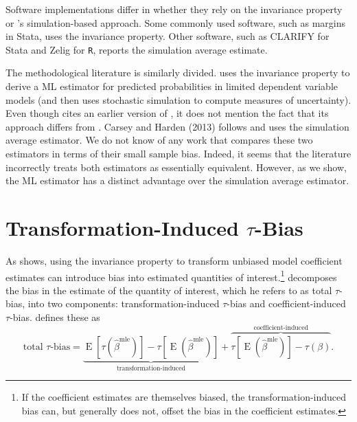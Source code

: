 \documentclass[11pt]{article}
\DeclareMathOperator*{\E}{\text{E}}
\begin{document}
Software implementations differ in whether they rely on the invariance property or \cite{KingTomzWittenberg2000}'s simulation-based approach. Some commonly used software, such as margins in Stata, uses the invariance property. Other software, such as CLARIFY for Stata and Zelig for \texttt{R}, reports the simulation average estimate.


The methodological literature is similarly divided. \cite{Herron1999} uses the invariance property to derive a ML estimator for predicted probabilities in limited dependent variable models (and then uses stochastic simulation to compute measures of uncertainty). Even though \cite{Herron1999} cites an earlier version of \cite{KingTomzWittenberg2000}, it does not mention the fact that its approach differs from \cite{KingTomzWittenberg2000}. Carsey and Harden (2013) follows \cite{KingTomzWittenberg2000} and uses the simulation average estimator. We do not know of any work that compares these two estimators in terms of their small sample bias. Indeed, it seems that the literature incorrectly treats both estimators as essentially equivalent. However, as we show, the ML estimator has a distinct advantage over the simulation average estimator.


\section*{Transformation-Induced $\tau$-Bias}

As \citet{Rainey2017} shows, using the invariance property to transform unbiased model coefficient estimates can introduce bias into estimated quantities of interest.\footnote{If the coefficient estimates are themselves biased, the transformation-induced bias can, but generally does not, offset the bias in the coefficient estimates.} \citet[p.\@ 404]{Rainey2017} decomposes the bias in the estimate of the quantity of interest, which he refers to as {total $\tau$-bias,} into two components: transformation-induced $\tau$-bias and coefficient-induced $\tau$-bias. \citet{Rainey2017} defines these as
\begin{equation}
\text{total } \tau\text{-bias}= \underbrace{ \E\left[\tau\left(\hat{\beta}^\text{mle}\right)\right]-  \tau\left[\E\left(\hat{\beta}^\text{mle}\right)\right]  }_{\text{transformation-induced}} + \overbrace{  \tau\left[\E\left(\hat{\beta}^\text{mle}\right)\right] - \tau\left(\beta\right)  }^{\text{coefficient-induced}}\text{.} \label{eqn:ti-bias}
\end{equation}
\end{document}
